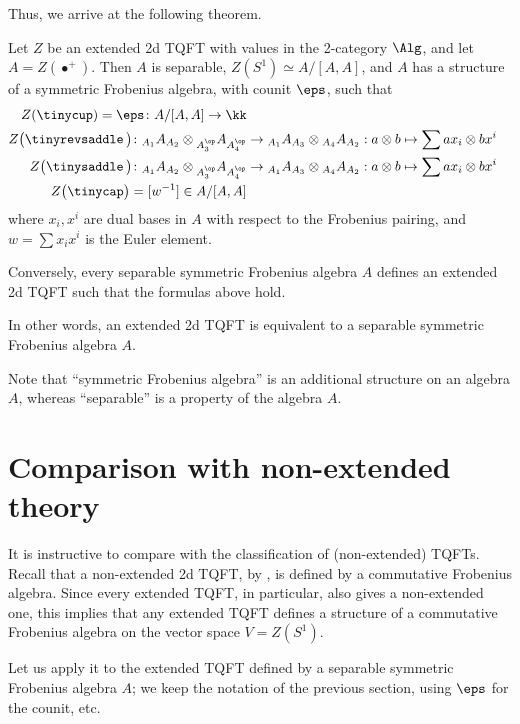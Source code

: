 Thus, we arrive at the following theorem.

\begin{theorem}\label{t:ext-tqft-frob3}
  Let $Z$ be an extended 2d TQFT with values in the 2-category $\Alg$,
  and let $A=Z(\bullet^+)$. Then $A$ is separable, $Z(S^1)\simeq A/[A,A]$,
  and $A$ has a structure of a symmetric Frobenius algebra, with counit
  $\eps$, such that
  \begin{align*}
   Z(\tinycup)=\eps\colon A/[A,A]\to\kk \\
   Z\bigl(\tinyrevsaddle \,\bigr)\colon
          {}_{A_1} A_{A_2}\otimes {}_{A^\op_3}A_{A^\op_4}
          &\to   {}_{A_1} A_{A_3}\otimes {}_{A_4}A_{A_2}:
          a\otimes b \mapsto \sum a x_i\otimes b x^i\\
   Z\bigl(\tinysaddle \,\bigr)\colon
          {}_{A_1} A_{A_2}\otimes {}_{A^\op_3}A_{A^\op_4}
          &\to   {}_{A_1} A_{A_3}\otimes {}_{A_4}A_{A_2}:
          a\otimes b \mapsto \sum a x_i\otimes b x^i\\
   Z\bigl(\tinycap\bigr)=[w^{-1}]\in A/[A,A]
   \end{align*}
   where $x_i, x^i$ are dual bases in $A$ with respect to the Frobenius pairing,
   and $w=\sum x_ix^i$ is the Euler element.

   Conversely, every separable symmetric Frobenius algebra $A$ defines an
   extended 2d TQFT such that the formulas above hold.
\end{theorem}

In other words, an extended 2d TQFT is equivalent to a separable symmetric
Frobenius algebra $A$.

Note that ``symmetric Frobenius algebra'' is an additional structure
on an algebra $A$, whereas ``separable'' is a property of the algebra $A$.




\section{Comparison with non-extended theory}\label{s:comparison-nonextended}
It is instructive to compare  with the classification of
(non-extended) TQFTs. Recall that a non-extended 2d TQFT, by
, is defined by a commutative Frobenius algebra.
Since every extended TQFT, in particular, also gives a non-extended one, this
implies that any extended TQFT defines a structure of a commutative Frobenius
algebra on the vector space $V=Z(S^1)$.

Let us apply it to the extended TQFT defined by a separable symmetric Frobenius
algebra $A$; we keep the notation of the previous section, using $\eps$ for the
counit, etc.

